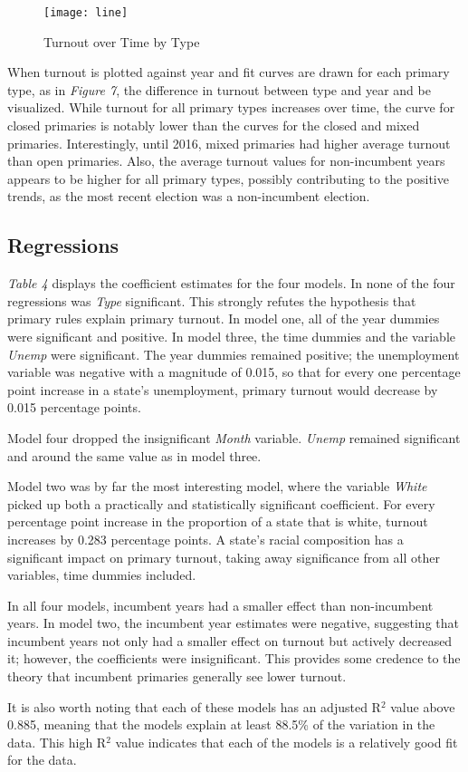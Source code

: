 \documentclass[12pt]{article}
\begin{document}
\begin{doublespace}
	\begin{figure}[h]
		\texttt{[image: line]}
		\caption{Turnout over Time by Type}
		\label{fig:figure7}
	\end{figure}
	When turnout is plotted against year and fit curves are drawn for each primary type, as in \textit{Figure 7}, the difference in turnout between type and year and be visualized. While turnout for all primary types increases over time, the curve for closed primaries is notably lower than the curves for the closed and mixed primaries. Interestingly, until 2016, mixed primaries had higher average turnout than open primaries. Also, the average turnout values for non-incumbent years appears to be higher for all primary types, possibly contributing to the positive trends, as the most recent election was a non-incumbent election.
	\subsection*{Regressions}
	\textit{Table 4} displays the coefficient estimates for the four models. In none of the four regressions was \textit{Type} significant. This strongly refutes the hypothesis that primary rules explain primary turnout. In model one, all of the year dummies were significant and positive. In model three, the time dummies and the variable \textit{Unemp} were significant. The year dummies remained positive; the unemployment variable was negative with a magnitude of 0.015, so that for every one percentage point increase in a state's unemployment, primary turnout would decrease by 0.015 percentage points. \par
	Model four dropped the insignificant \textit{Month} variable. \textit{Unemp} remained significant and around the same value as in model three. \par
	Model two was by far the most interesting model, where the variable \textit{White} picked up both a practically and statistically significant coefficient. For every percentage point increase in the proportion of a state that is white, turnout increases by 0.283 percentage points. A state's racial composition has a significant impact on primary turnout, taking away significance from all other variables, time dummies included.\par
	In all four models, incumbent years had a smaller effect than non-incumbent years. In model two, the incumbent year estimates were negative, suggesting that incumbent years not only had a smaller effect on turnout but actively decreased it; however, the coefficients were insignificant. This provides some credence to the theory that incumbent primaries generally see lower turnout.\par
	It is also worth noting that each of these models has an adjusted R$^{2}$ value above 0.885, meaning that the models explain at least 88.5\% of the variation in the data. This high R$^{2}$ value indicates that each of the models is a relatively good fit for the data.
\end{doublespace}
\end{document}

